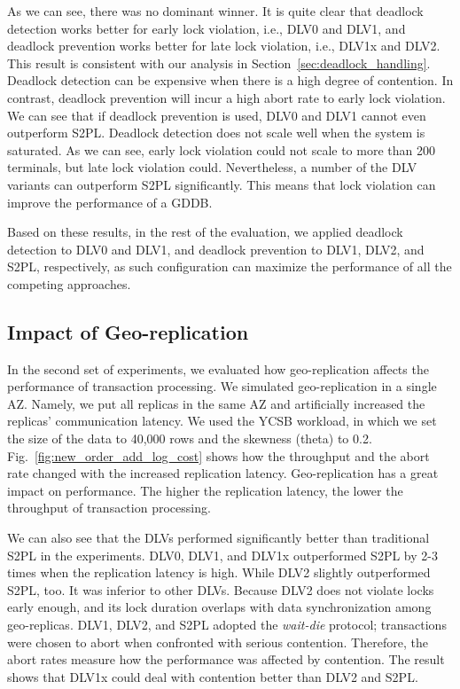 \documentclass[conference]{IEEEtran}
\begin{document}
      
As we can see, there was no dominant winner. It is quite clear that deadlock detection works better for early lock violation, i.e., DLV0 and DLV1, 
and deadlock prevention works better for late lock violation, i.e., DLV1x and DLV2. This result is consistent with our analysis in Section~\ref{sec:deadlock_handling}.
Deadlock detection can be expensive when there is a high degree of contention. In contrast, deadlock prevention will incur a high abort rate to early lock violation.
We can see that if deadlock prevention is used, DLV0 and DLV1 cannot even outperform S2PL. 
Deadlock detection does not scale well when the system is saturated.
As we can see, early lock violation could not scale to more than 200 terminals, but late lock violation could.
Nevertheless, a number of the DLV variants can outperform S2PL significantly. This means that lock violation can improve the performance of a GDDB.

Based on these results, in the rest of the evaluation, we applied deadlock detection to DLV0 and DLV1, and deadlock prevention to DLV1, DLV2, and S2PL, respectively,
as such configuration can maximize the performance of all the competing approaches.


\subsection{Impact of Geo-replication}

In the second set of experiments, we evaluated how geo-replication affects the performance of transaction processing.
We simulated geo-replication in a single AZ.
Namely, we put all replicas in the same AZ and artificially increased the replicas' communication latency.
We used the YCSB workload, in which we set the size of the data to 40,000 rows and the skewness (theta) to 0.2.
Fig.~\ref{fig:new_order_add_log_cost} shows how the throughput and the abort rate changed with the increased replication latency.
Geo-replication has a great impact on performance. The higher the replication latency, the lower the throughput of transaction processing.

We can also see that the DLVs performed significantly better than traditional S2PL in the experiments.
DLV0, DLV1, and DLV1x outperformed S2PL by 2-3 times when the replication latency is high.
While DLV2 slightly outperformed S2PL, too. It was inferior to other DLVs.
Because DLV2 does not violate locks early enough, and its lock duration overlaps with data synchronization among geo-replicas.
DLV1, DLV2, and S2PL adopted the \emph{wait-die} protocol; transactions were chosen to abort when confronted with serious contention.
Therefore, the abort rates measure how the performance was affected by contention.
The result shows that DLV1x could deal with contention better than DLV2 and S2PL.
\end{document}
